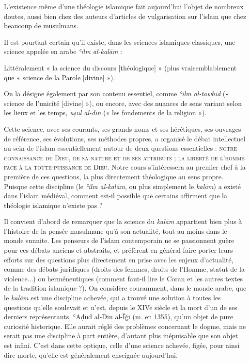 L'existence même d'une théologie islamique fait aujourd'hui l'objet de
nombreux doutes, aussi bien chez des auteurs d'articles de vulgarisation
sur l'islam que chez beaucoup de musulmans.

Il est pourtant certain qu'il existe, dans les sciences islamiques
classiques, une science appelée en arabe \emph{ʿilm al-kalām} :
\begin{Def}
Littéralement « la science du discours {[}théologique{]} » (plus
vraisemblablement que « science de la Parole {[}divine{]} »). 

On la
désigne également par son contenu essentiel, comme \emph{ʿilm al-tawhīd}
(« science de l'unicité {[}divine{]} »), ou encore, avec des nuances de
sens variant selon les lieux et les temps, \emph{uṣūl al-dīn} (« les
fondements de la religion »). 
\end{Def}

Cette science, avec ses courants, ses
grands noms et ses hérétiques, ses ouvrages de référence, ses
évolutions, ses méthodes propres, a organisé le débat intellectuel au
sein de l'islam essentiellement autour de deux questions essentielles :
\textsc{notre connaissance de Dieu, de sa nature et de ses attributs ; la
liberté de l'homme face à la toute-puissance de Dieu}. Notre cours
s'intéressera au premier chef à la première de ces questions, la plus
directement théologique au sens propre. Puisque cette discipline (le
\emph{ʿilm al-kalām}, ou plus simplement le \emph{kalām}) a existé dans
l'islam médiéval, comment est-il possible que certains affirment que la
théologie islamique n'existe pas ?

Il convient d'abord de remarquer que la science du \emph{kalām}
appartient bien plus à l'histoire de la pensée musulmane qu'à son
actualité, tout au moins dans le monde sunnite. Les penseurs de l'islam
contemporain ne se passionnent guère pour ces débats anciens et
abstraits, et préfèrent en général faire porter leurs efforts sur des
questions plus directement
en prise avec les enjeux d'actualité, comme des débats juridiques
(droits des femmes, droits de l'Homme, statut de la violence...) ou
herméneutiques (comment faut-il lire le Coran et les autres textes de la
tradition islamique ?). On considère couramment, dans le monde arabe,
que le \emph{kalām} est une discipline achevée, qui a trouvé une
solution à toutes les questions qu'elle soulevait et n'est, depuis le
XIVe siècle et la mort d'un de ses derniers représentants, ʿAḍud al-Dīn
al-Īǧī (m. en 1355), qu'un objet de pure curiosité historique. Elle
aurait réglé des problèmes concernant le dogme, mais ne serait pas une
discipline à part entière, d'autant plus inépuisable que son objet est
infini. C'est dans cette optique, celle d'une science achevée, figée,
pour ainsi dire morte, qu'elle est généralement enseignée aujourd'hui.

